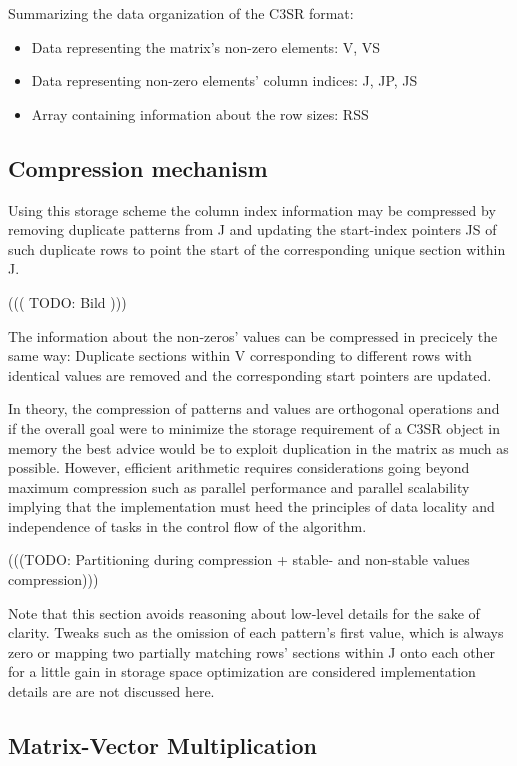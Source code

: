\documentclass{article}
\begin{document}
    Summarizing the data organization of the C3SR format:
    \begin{itemize}
      \item Data representing the matrix's non-zero elements: V, VS
      \item Data representing non-zero elements' column indices: J, JP, JS
      \item Array containing information about the row sizes: RSS
    \end{itemize}

  \subsection{Compression mechanism}

    Using this storage scheme the column index information may be compressed by removing duplicate patterns from J and
    updating the start-index pointers JS of such duplicate rows to point the start of the corresponding unique section
    within J.

      ((( TODO: Bild )))

    The information about the non-zeros' values can be compressed in precicely the same way: Duplicate sections within V
    corresponding to different rows with identical values are removed and the corresponding start pointers are updated.

    In theory, the compression of patterns and values are orthogonal operations and if the overall goal were to minimize
    the storage requirement of a C3SR object in memory the best advice would be to exploit duplication in the matrix as
    much as possible. However, efficient arithmetic requires considerations going beyond maximum compression such as
    parallel performance and parallel scalability implying that the implementation must heed the principles of
    data locality and independence of tasks in the control flow of the algorithm.

    (((TODO: Partitioning during compression + stable- and non-stable values compression)))

    Note that this section avoids reasoning about low-level details for the sake of clarity. Tweaks such as the omission
    of each pattern's first value, which is always zero or mapping two partially matching rows' sections within J onto
    each other for a little gain in storage space optimization are considered implementation details are are not discussed
    here.

  \subsection{Matrix-Vector Multiplication}
\end{document}

